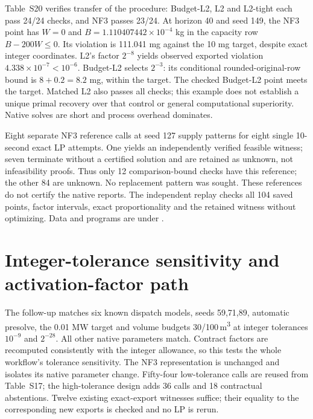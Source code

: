 \documentclass[11pt]{article}
\begin{document}
\begin{table}[!htbp]
\centering\small
\caption{Independent batch-scheduling checks. Entries count returned points meeting
all original-row and variable-bound budgets after integer rounding. All integers
are retained. Changed rows compares exact dyadic Budget-L2 with matched dyadic L2.
The final row totals 24 calls per policy. Budget delivery is not exact feasibility
or a certificate of the reported MILP bound or gap. NF3's sole failing point has
111.041 mg capacity violation against 10 mg; the contractual bound is 8.2 mg.}
\label{tab:external-transfer}

\end{table}

Table~S20 verifies transfer of the procedure: Budget-L2, L2 and L2-tight each pass
24/24 checks, and NF3 passes 23/24. At horizon 40 and seed 149, the NF3 point has
$W=0$ and $B=1.110407442\times10^{-4}$ kg in the capacity row $B-200W\le0$.
Its violation is 111.041 mg against the 10 mg target, despite exact integer
coordinates. L2's factor $2^{-8}$ yields observed exported violation
$4.338\times10^{-7}<10^{-6}$. Budget-L2 selects $2^{-3}$: its conditional
rounded-original-row bound is $8+0.2=8.2$ mg, within the target. The checked
Budget-L2 point meets the target. Matched L2 also passes all checks; this example
does not establish a unique primal recovery over that control or general
computational superiority. Native solves are short and process overhead dominates.

Eight separate NF3 reference calls at seed 127 supply patterns for eight single
10-second exact LP attempts. One yields an independently verified feasible
witness; seven terminate without a certified solution and are retained as unknown,
not infeasibility proofs. Thus only 12 comparison-bound checks have this reference;
the other 84 are unknown. No replacement pattern was sought. These references do
not certify the native reports. The independent replay checks all 104 saved points,
factor intervals, exact proportionality and the retained witness without optimizing.
Data and programs are under .

\FloatBarrier
\section{Integer-tolerance sensitivity and activation-factor path}
The follow-up matches six known dispatch models, seeds 59,71,89, automatic
presolve, the 0.01 MW target and volume budgets 30/100\,m\textsuperscript{3} at
integer tolerances $10^{-9}$ and $2^{-28}$. All other native parameters match.
Contract factors are recomputed consistently with the integer allowance, so this
tests the whole workflow's tolerance sensitivity. The NF3 representation is
unchanged and isolates its native parameter change. Fifty-four low-tolerance
calls are reused from Table~S17; the high-tolerance design adds 36 calls and
18 contractual abstentions. Twelve existing exact-export witnesses suffice;
their equality to the corresponding new exports is checked and no LP is rerun.
\end{document}
